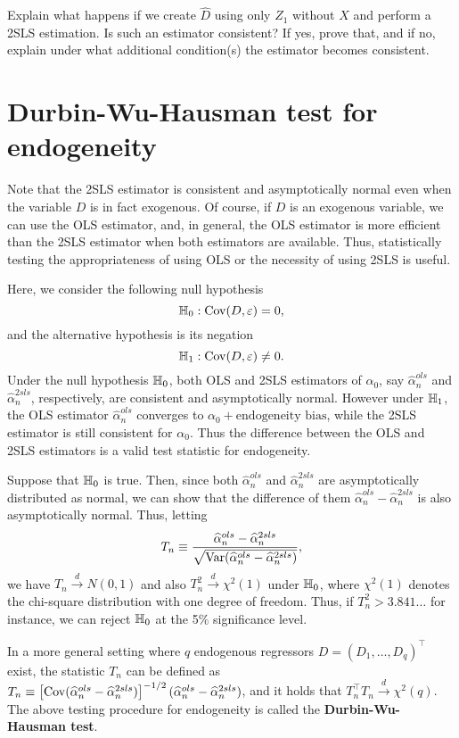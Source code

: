 \documentclass[11pt, A4paper, openany, uplatex]{book}
\begin{document}
\hrulefill
\begin{exercise}\upshape
	Explain what happens if we create $\hat D$ using only $Z_1$ without $X$ and perform a 2SLS estimation.
	Is such an estimator consistent? If yes, prove that, and if no, explain under what additional condition(s) the estimator becomes consistent.
\end{exercise}

\section{Durbin-Wu-Hausman test for endogeneity}

Note that the 2SLS estimator is consistent and asymptotically normal even when the variable $D$ is in fact exogenous. 
Of course, if $D$ is an exogenous variable, we can use the OLS estimator, and, in general, the OLS estimator is more efficient than the 2SLS estimator when both estimators are available.
Thus, statistically testing the appropriateness of using OLS or the necessity of using 2SLS is useful.

Here, we consider the following null hypothesis
\[
	\mathbb{H}_0: \mathrm{Cov}(D, \varepsilon) = 0,
\]
and the alternative hypothesis is its negation
\[
	\mathbb{H}_1: \mathrm{Cov}(D, \varepsilon) \neq 0.
\]
Under the null hypothesis $\mathbb{H}_0$, both OLS and 2SLS estimators of $\alpha_0$, say $\hat \alpha_n^{ols}$ and $\hat \alpha_n^{2sls}$, respectively,  are consistent and asymptotically normal.
However under $\mathbb{H}_1$, the OLS estimator $\hat \alpha_n^{ols}$ converges to $\alpha_0 + \text{endogeneity bias}$, while the 2SLS estimator is still consistent for $\alpha_0$.
Thus the difference between the OLS and 2SLS estimators is a valid test statistic for endogeneity. 

Suppose that $\mathbb{H}_0$ is true.
Then, since both $\hat \alpha_n^{ols}$ and $\hat \alpha_n^{2sls}$ are asymptotically distributed as normal, we can show that the difference of them $\hat \alpha_n^{ols} - \hat \alpha_n^{2sls}$ is also asymptotically normal.
Thus, letting 
\[
	T_n \equiv \frac{\widehat \alpha_n^{ols} - \widehat \alpha_n^{2sls}}{\sqrt{\mathrm{Var}(\widehat \alpha_n^{ols} - \widehat \alpha_n^{2sls})}},
\]	
we have $T_n \overset{d}{\to} N (0,1)$ and also $T_n^2 \overset{d}{\to} \chi^2(1)$ under $\mathbb{H}_0$, where $\chi^2(1)$ denotes the chi-square distribution with one degree of freedom.
Thus, if $T_n^2 > 3.841\ldots$ for instance, we can reject $\mathbb{H}_0$ at the 5\% significance level.

In a more general setting where $q$ endogenous regressors $D = (D_1, \ldots, D_q)^\top$ exist, the statistic $T_n$ can be defined as $T_n \equiv \left[\mathrm{Cov}(\widehat \alpha_n^{ols} - \widehat \alpha_n^{2sls})\right]^{-1/2}(\widehat \alpha_n^{ols} - \widehat \alpha_n^{2sls})$, and it holds that $T_n^\top T_n \overset{d}{\to} \chi^2(q)$.
The above testing procedure for endogeneity is called the \textbf{Durbin-Wu-Hausman test}.
\end{document}
